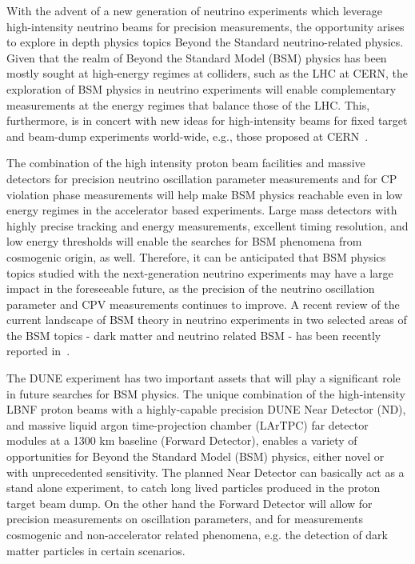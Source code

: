 
With the advent of a new generation of neutrino experiments which leverage high-intensity neutrino beams for precision measurements, 
the opportunity arises to explore in depth physics topics Beyond the Standard neutrino-related physics. 
Given that the realm of Beyond the Standard Model (BSM) physics  has been mostly sought at high-energy regimes at colliders, 
such as the LHC at CERN, the exploration of BSM physics in neutrino experiments will enable complementary 
measurements at the energy regimes that balance those  of the LHC. 
This, furthermore, is  in concert with new ideas for high-intensity beams for fixed target and beam-dump experiments 
world-wide, e.g., those proposed at CERN~\cite{Beacham:2019nyx}.

The combination of the high intensity proton beam facilities and massive detectors for precision neutrino oscillation parameter measurements and for CP violation phase measurements will help make BSM physics reachable even in low energy regimes in the accelerator based experiments.
Large mass detectors with highly precise tracking and energy measurements, excellent timing resolution, and low energy thresholds will enable the searches for BSM phenomena from cosmogenic origin, as well.
Therefore, it can be anticipated that BSM physics topics studied with the next-generation neutrino 
experiments may have a large impact in the foreseeable future, 
as the precision of the neutrino oscillation parameter and CPV measurements continues to improve.
A recent review of the current landscape of BSM theory in neutrino experiments in two selected areas of the BSM topics - dark matter and neutrino related BSM - has been recently reported in~\cite{Arguelles:2019xgp}.

The DUNE experiment has two important assets that will play a significant role in 
future searches for BSM physics.
The unique combination of the high-intensity LBNF proton beams with a highly-capable precision
 DUNE Near Detector (ND), and massive liquid argon time-projection chamber (LArTPC) far detector modules at a 1300 km baseline (Forward Detector), enables a variety of opportunities for Beyond the Standard Model (BSM) physics, either novel or with unprecedented sensitivity.
The planned Near Detector can basically act as a stand alone experiment,
to catch long lived particles produced in the proton target beam dump. On the other hand the Forward Detector
will allow for precision measurements on oscillation parameters, and for measurements cosmogenic and
 non-accelerator related phenomena, e.g. the detection of dark matter particles in certain scenarios.

